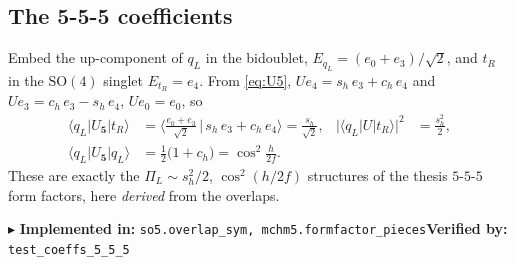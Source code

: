 \documentclass[11pt]{article}
\newcommand{\SO}[1]{\mathrm{SO}(#1)}
\newcommand{\sh}{s_h}
\newcommand{\ch}{c_h}
\newcommand{\code}[1]{\texttt{#1}}
\newcommand{\impl}[2]{\par\smallskip\noindent\textcolor{blue!60!black}{\small$\blacktriangleright$ \textbf{Implemented in:} \code{#1}\quad\textbf{Verified by:} \code{#2}}\par\smallskip}
\begin{document}
\subsection{The $\mathbf{5}$-$\mathbf{5}$-$\mathbf{5}$ coefficients}
Embed the up-component of $q_L$ in the bidoublet, $E_{q_L}=(e_0+e_3)/\sqrt2$, and $t_R$ in the
$\SO4$ singlet $E_{t_R}=e_4$. From \eqref{eq:U5}, $U e_4=\sh\,e_3+\ch\,e_4$ and $U e_3=\ch\,e_3-\sh\,e_4$,
$Ue_0=e_0$, so
\begin{align}
  \langle q_L|U_{\mathbf 5}|t_R\rangle
  &=\big\langle\tfrac{e_0+e_3}{\sqrt2}\,\big|\,\sh\,e_3+\ch\,e_4\big\rangle=\frac{\sh}{\sqrt2},
  &\big|\langle q_L|U|t_R\rangle\big|^2&=\frac{\sh^2}{2},\\
  \langle q_L|U_{\mathbf 5}|q_L\rangle
  &=\tfrac12\big(1+\ch\big)=\cos^2\!\tfrac{h}{2f}.
\end{align}
These are exactly the $\Pi_L\sim\sh^2/2$, $\cos^2(h/2f)$ structures of the thesis $5$-$5$-$5$ form
factors, here \emph{derived} from the overlaps.
\impl{so5.overlap\_sym, mchm5.formfactor\_pieces}{test\_coeffs\_5\_5\_5}
\end{document}
